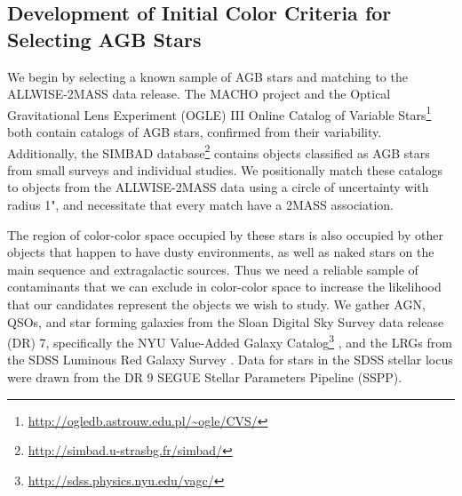 \subsection{Development of Initial Color Criteria for Selecting AGB Stars}
We begin by selecting a known sample of AGB stars and matching to the ALLWISE-2MASS data release. The MACHO project \citep{2008AJ....136.1242F} and the Optical Gravitational Lens Experiment (OGLE) III Online Catalog of Variable Stars\footnote{\url{http://ogledb.astrouw.edu.pl/~ogle/CVS/}} both contain catalogs of AGB stars, confirmed from their variability. Additionally, the SIMBAD database\footnote{\url{http://simbad.u-strasbg.fr/simbad/}} contains objects classified as AGB stars from small surveys and individual studies. We positionally match these catalogs to objects from the ALLWISE-2MASS data using a circle of uncertainty with radius 1", and necessitate that every match have a 2MASS association.

The region of color-color space occupied by these stars is also occupied by other objects that happen to have dusty environments, as well as naked stars on the main sequence and extragalactic sources. Thus we need a reliable sample of contaminants that we can exclude in color-color space to increase the likelihood that our candidates represent the objects we wish to study. We gather AGN, QSOs, and star forming galaxies from the Sloan Digital Sky Survey \citep{2000AJ....120.1579Y} data release (DR) 7, specifically the NYU Value-Added Galaxy Catalog\footnote{\url{http://sdss.physics.nyu.edu/vagc/}} \citep[VAGC]{2005AJ....129.2562B}, and the LRGs from the SDSS Luminous Red Galaxy Survey \citep{2010ApJ...710.1444K}. Data for stars in the SDSS stellar locus \citep{2014MNRAS.440.3430D} were drawn from the DR 9 SEGUE Stellar Parameters Pipeline (SSPP).

